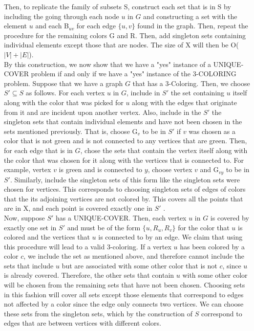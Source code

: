 \documentclass[]{report}
\begin{document}
\begin{enumerate}
	Then, to replicate the family of subsets S, construct each set that is in S by including the going through each node $u$ in $G$ and constructing a set with the element $u$ and each B$_{uv}$ for each edge $\{u,v\}$ found in the graph. Then, repeat the procedure for the remaining colors G and R. Then, add singleton sets containing individual elements except those that are nodes. The size of X will then be O($|V| + |E|$).\\
	
	By this construction, we now show that we have a "yes" instance of a UNIQUE-COVER  problem if and only if we have a "yes" instance of the 3-COLORING problem. Suppose that we have a graph $G$ that has a 3-Coloring. Then, we choose $S'\subseteq S$ as follows. For each vertex $u$ in $G$, include in $S'$ the set containing $u$ itself along with the color that was picked for $u$ along with the edges that originate from it and are incident upon another vertex. Also, include in the $S'$ the singleton sets that contain individual elements and have not been chosen in the sets mentioned previously. That is, choose G$_{v}$ to be in $S'$ if $v$ was chosen as a color that is not green and is not connected to any vertices that are green.  Then, for each edge that is in $G$, chose the sets that contain the vertex itself along with the color that was chosen for it along with the vertices that is connected to. For example, vertex $v$ is green and is connected to $y$, choose vertex $v$ and G$_{vy}$ to be in $S'$. Similarly, include the singleton sets of this form like the singleton sets were chosen for vertices. This corresponds to choosing singleton sets of edges of colors that the its adjoining vertices are not colored by. This covers all the points that are in X, and each point is covered exactly one in $S'$ .  \\
	
	Now, suppose $S'$ has a UNIQUE-COVER. Then, each vertex $u$ in $G$ is covered by exactly one set in $S'$ and must be of the form $\{u, R_{u}, R_{v} \} $ for the color that $u$ is colored and the vertices that $u$ is connected to by an edge. We claim that using this procedure will lead to a valid 3-coloring. If a vertex $u$ has been colored by a color $c$, we include the set as mentioned above, and therefore cannot include the sets that include $u$ but are associated with some other color that is not $c$, since $u$ is already covered. Therefore, the other sets that contain $u$ with some other color will be chosen from the remaining sets that have not been chosen. Choosing sets in this fashion will cover all sets except those elements that correspond to edges not affected by a color since the edge only connects two vertices. We can choose these sets from the singleton sets, which by the construction of $S$ correspond to edges that are between vertices with different colors. \\
	

\end{enumerate}
\end{document}
